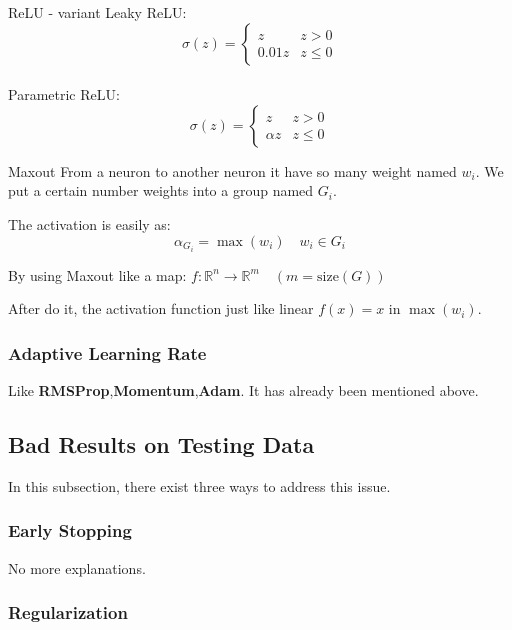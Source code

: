 \documentclass{article}
\begin{document}
\begin{tipsblock}{ReLU - variant}
        Leaky ReLU:
        $$
        \sigma(z) = \left\{\begin{matrix}z  & z>0\\0.01z  & z\le 0\end{matrix}\right.
        $$
        \\
        Parametric ReLU:
        $$
        \sigma(z) = \left\{\begin{matrix}z  & z>0\\\alpha z  & z\le 0\end{matrix}\right.
        $$
\end{tipsblock}

\begin{tipsblock}{Maxout}
        From a neuron to another neuron it have so many weight named $w_i$. We put a certain number weights into a group named $G_i$.

        The activation is easily as:
        $$
        \alpha_{G_i} = \max(w_i) \quad w_i\in G_i
        $$

        By using Maxout like a map: $f:\mathbb R^n\to\mathbb R^m\quad(m = \text{size}(G))$

        After do it, the activation function just like linear $f(x) = x$ in $\max(w_i)$.
\end{tipsblock}

\subsubsection{Adaptive Learning Rate}

Like \textbf{RMSProp},\textbf{Momentum},\textbf{Adam}. It has already been mentioned above.

\subsection{Bad Results on Testing Data}

In this subsection, there exist three ways to address this issue.

\subsubsection{Early Stopping}

No more explanations.

\subsubsection{Regularization}
\end{document}
